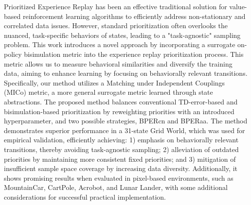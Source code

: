 Prioritized Experience Replay has been an effective traditional solution for value-based reinforcement learning algorithms to efficiently address non-stationary and correlated data issues. However, standard prioritization often overlooks the nuanced, task-specific behaviors of states, leading to a "task-agnostic" sampling problem. This work introduces a novel approach by incorporating a surrogate on-policy bisimulation metric into the experience replay prioritization process. This metric allows us to measure behavioral similarities and diversify the training data, aiming to enhance learning by focusing on behaviorally relevant transitions. Specifically, our method utilizes a Matching under Independent Couplings (MICo) metric, a more general surrogate metric learned through state abstractions. The proposed method balances conventional TD-error-based and bisimulation-based prioritization by reweighting priorities with an introduced hyperparameter, and two possible strategies, BPERcn and BPERaa. The method demonstrates superior performance in a 31-state Grid World, which was used for empirical validation, efficiently achieving: 1) emphasis on behaviorally relevant transitions, thereby avoiding task-agnostic sampling; 2) alleviation of outdated priorities by maintaining more consistent fixed priorities; and 3) mitigation of insufficient sample space coverage by increasing data diversity. Additionally, it shows promising results when evaluated in pixel-based environments, such as MountainCar, CartPole, Acrobot, and Lunar Lander, with some additional considerations for successful practical implementation.

